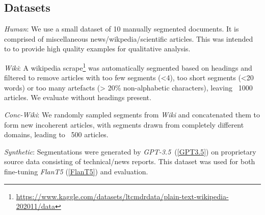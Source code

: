 \subsection{Datasets}


\emph{Human}: We use a small dataset of 10 manually segmented documents. It is comprised of miscellaneous news/wikpedia/scientific articles. This was intended to to provide high quality examples for qualitative analysis.

\emph{Wiki}: A wikipedia scrape\footnote{\url{https://www.kaggle.com/datasets/ltcmdrdata/plain-text-wikipedia-202011/data}} was automatically segmented based on headings and filtered to remove articles with too few segments (<4), too short segments (<20 words) or too many artefacts (> 20\% non-alphabetic characters), leaving ~1000 articles. We evaluate without headings present.

\emph{Conc-Wiki}: We randomly sampled segments from \emph{Wiki} and concatenated them to form new incoherent articles, with segments drawn from completely different domains, leading to ~500 articles.

\emph{Synthetic}: Segmentations were generated by \emph{GPT-3.5}~(\ref{GPT3.5}) on proprietary source data consisting of technical/news reports. This dataset was used for both fine-tuning \emph{FlanT5} (\ref{FlanT5}) and evaluation.